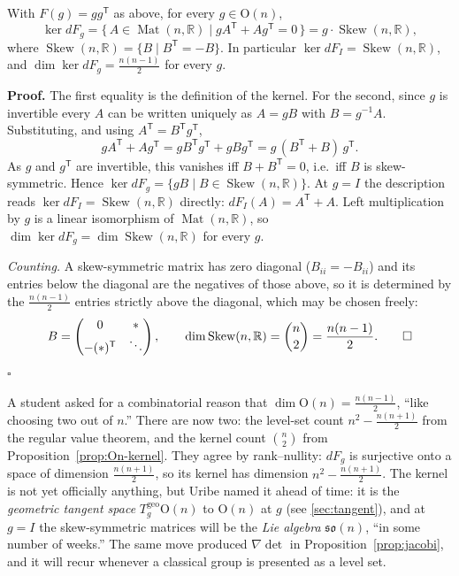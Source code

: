 \documentclass[11pt]{report}
\makeatletter
\newcounter{thmcounter}[section]
\renewenvironment{proof}[1][Proof]{\noindent\textbf{#1.} }{\hfill$\square$\par\vspace{5pt}}
\newcommand{\thmlabel}[1]{\edef\@currentlabel{\arabic{section}.\arabic{thmcounter}}\label{#1}}
\newcommand{\Ogp}{\mathrm{O}}
\DeclareMathOperator{\Mat}{Mat}
\DeclareMathOperator{\Skew}{Skew}
\newcommand{\geo}{\mathrm{geo}}
\makeatother
\begin{document}
\begin{propbox}\thmlabel{prop:On-kernel}
With $F(g) = gg^{\mathsf T}$ as above, for every $g \in \Ogp(n)$,
\[
\ker dF_g = \{\, A \in \Mat(n,\mathbb{R}) \mid gA^{\mathsf T} + Ag^{\mathsf T} = 0 \,\} = g \cdot \Skew(n,\mathbb{R}),
\]
where $\Skew(n,\mathbb{R}) = \{B \mid B^{\mathsf T} = -B\}$. In particular $\ker dF_I = \Skew(n,\mathbb{R})$, and $\dim \ker dF_g = \tfrac{n(n-1)}{2}$ for every $g$.
\end{propbox}

\begin{proof}
The first equality is the definition of the kernel. For the second, since $g$ is invertible every $A$ can be written uniquely as $A = gB$ with $B = g^{-1}A$. Substituting, and using $A^{\mathsf T} = B^{\mathsf T} g^{\mathsf T}$,
\[
gA^{\mathsf T} + Ag^{\mathsf T} = g B^{\mathsf T} g^{\mathsf T} + g B g^{\mathsf T} = g\,(B^{\mathsf T} + B)\,g^{\mathsf T}.
\]
As $g$ and $g^{\mathsf T}$ are invertible, this vanishes iff $B + B^{\mathsf T} = 0$, i.e.\ iff $B$ is skew-symmetric. Hence $\ker dF_g = \{gB \mid B \in \Skew(n,\mathbb{R})\}$. At $g = I$ the description reads $\ker dF_I = \Skew(n,\mathbb{R})$ directly: $dF_I(A) = A^{\mathsf T} + A$. Left multiplication by $g$ is a linear isomorphism of $\Mat(n,\mathbb{R})$, so $\dim \ker dF_g = \dim \Skew(n,\mathbb{R})$ for every $g$.

\emph{Counting.} A skew-symmetric matrix has zero diagonal ($B_{ii} = -B_{ii}$) and its entries below the diagonal are the negatives of those above, so it is determined by the $\tfrac{n(n-1)}{2}$ entries strictly above the diagonal, which may be chosen freely:
\[
B = \begin{pmatrix} 0 & \ast \\ -(\ast)^{\mathsf T} & \ddots \end{pmatrix}, \qquad \dim \Skew(n,\mathbb{R}) = \binom{n}{2} = \frac{n(n-1)}{2}. \qedhere
\]
\end{proof}

\begin{rembox}\label{rem:two-readings-dimension}
A student asked for a combinatorial reason that $\dim \Ogp(n) = \tfrac{n(n-1)}{2}$, ``like choosing two out of $n$.'' There are now two: the level-set count $n^2 - \tfrac{n(n+1)}{2}$ from the regular value theorem, and the kernel count $\binom{n}{2}$ from Proposition~\ref{prop:On-kernel}. They agree by rank--nullity: $dF_g$ is surjective onto a space of dimension $\tfrac{n(n+1)}{2}$, so its kernel has dimension $n^2 - \tfrac{n(n+1)}{2}$. The kernel is not yet officially anything, but Uribe named it ahead of time: it is the \emph{geometric tangent space} $T^{\geo}_g\Ogp(n)$ to $\Ogp(n)$ at $g$ (see \ref{sec:tangent}), and at $g = I$ the skew-symmetric matrices will be the \emph{Lie algebra} $\mathfrak{so}(n)$, ``in some number of weeks.'' The same move produced $\nabla\det$ in Proposition~\ref{prop:jacobi}, and it will recur whenever a classical group is presented as a level set.
\end{rembox}
\end{document}

